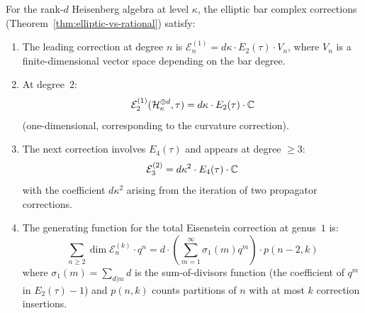 \begin{proposition}
\label{prop:multi-boson-eisenstein}
For the rank-$d$ Heisenberg algebra at level $\kappa$, the elliptic
bar complex corrections (Theorem~\ref{thm:elliptic-vs-rational})
satisfy:
\begin{enumerate}[label=\textup{(\roman*)}]
\item The leading correction at degree $n$ is
$\mathcal{E}^{(1)}_n = d\kappa \cdot E_2(\tau)
\cdot V_n$, where $V_n$ is a finite-dimensional vector space
depending on the bar degree.
\item At degree~$2$:
\begin{equation}\label{eq:multi-boson-E2}
\mathcal{E}^{(1)}_2(\mathcal{H}_\kappa^{\oplus d}, \tau)
= d\kappa \cdot E_2(\tau) \cdot \mathbb{C}
\end{equation}
(one-dimensional, corresponding to the curvature correction).
\item The next correction involves $E_4(\tau)$ and appears at
degree $\geq 3$:
\begin{equation}\label{eq:multi-boson-E4}
\mathcal{E}^{(2)}_3 = d\kappa^2 \cdot E_4(\tau) \cdot \mathbb{C}
\end{equation}
with the coefficient $d\kappa^2$ arising from the iteration of
two propagator corrections.
\item The generating function for the total Eisenstein correction
at genus~$1$ is:
\begin{equation}\label{eq:multi-boson-eisenstein-gen}
\sum_{n \geq 2} \dim \mathcal{E}^{(k)}_n \cdot q^n
= d \cdot \left(\sum_{m=1}^{\infty} \sigma_1(m) q^m\right)
\cdot p(n-2, k)
\end{equation}
where $\sigma_1(m) = \sum_{d|m} d$ is the sum-of-divisors function
(the coefficient of $q^m$ in $E_2(\tau) - 1$) and $p(n, k)$ counts
partitions of $n$ with at most $k$ correction insertions.
\end{enumerate}
\end{proposition}

